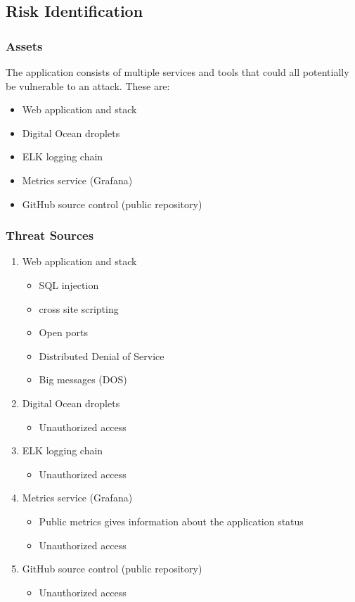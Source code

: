\subsection{Risk Identification}
\subsubsection{Assets}
The application consists of multiple services and tools that could all potentially be vulnerable to an attack. These are:
\begin{itemize}
    \item Web application and stack
    \item Digital Ocean droplets
    \item ELK logging chain
    \item Metrics service (Grafana)
    \item GitHub source control (public repository)
\end{itemize}

\subsubsection{Threat Sources}
\begin{enumerate}
    \item Web application and stack
    \begin{itemize}
        \item SQL injection
        \item cross site scripting
        \item Open ports
        \item Distributed Denial of Service
        \item Big messages (DOS)
    \end{itemize}
    \item Digital Ocean droplets
    \begin{itemize}
        \item Unauthorized access
    \end{itemize}
    \item ELK logging chain
    \begin{itemize}
        \item Unauthorized access
    \end{itemize}
    \item Metrics service (Grafana)
    \begin{itemize}
        \item Public metrics gives information about the application status
        \item Unauthorized access
    \end{itemize}
    \item GitHub source control (public repository) 
    \begin{itemize}
        \item Unauthorized access
    \end{itemize}
\end{enumerate}

